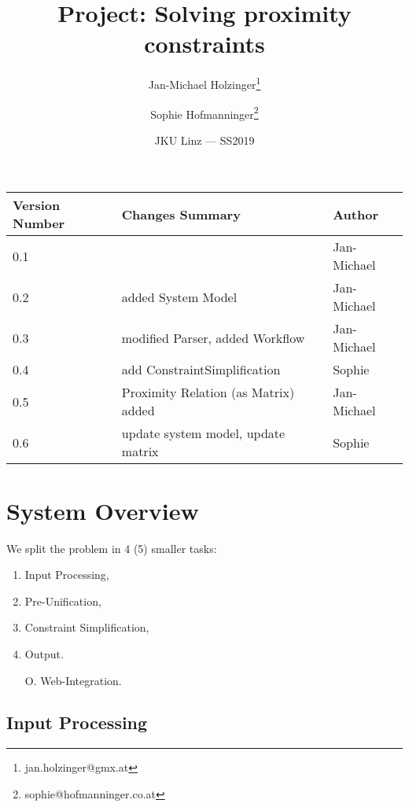 \documentclass{article}
\title{Project: Solving proximity constraints} %
\author{Jan-Michael Holzinger\thanks{jan.holzinger@gmx.at} \and Sophie Hofmanninger\thanks{sophie@hofmanninger.co.at}} %
\date{JKU Linz --- SS2019} %
\begin{document}
\maketitle %


\begin{center}
\begin{tabular}[h]{|l|l|l|}
\hline
Version Number & Changes Summary & Author\\
\hline
0.1 & & Jan-Michael\\
\hline
0.2 & added System Model & Jan-Michael\\
\hline
0.3 & modified Parser, added Workflow & Jan-Michael\\
\hline
0.4 & add ConstraintSimplification & Sophie\\
\hline
0.5 & Proximity Relation (as Matrix) added & Jan-Michael\\
\hline
0.6 & update system model, update matrix & Sophie\\
\hline
\end{tabular}

\end{center}
\section{System Overview}

We split the problem in 4 (5) smaller tasks:
\begin{enumerate}
	\item Input Processing,
	\item Pre-Unification,
	\item Constraint Simplification,
	\item Output.
	\item [O.] Web-Integration.
\end{enumerate}







\subsection{Input Processing} 
\end{document}
